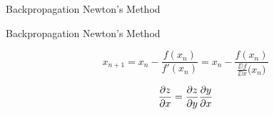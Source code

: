 \begin{frame}{Backpropagation}
  Newton's Method
\end{frame}

\begin{frame}{Backpropagation}
  Newton's Method
  
  \begin{displaymath}
    x_{n+1}
    = x_n - \frac{f(x_n)}{f'(x_n)}
    = x_n - \frac{f(x_n)}{\frac{\DD{f}}{\DD{x}} \big(x_n\big) }
  \end{displaymath}

\end{frame}

\begin{frame}
  \begin{minipage}{.5\linewidth}
  \end{minipage}%
  \begin{minipage}{.5\linewidth}
    \begin{displaymath}
      \pdv{z}{x} = \pdv{z}{y}\pdv{y}{x}
    \end{displaymath}
  \end{minipage}
\end{frame}


